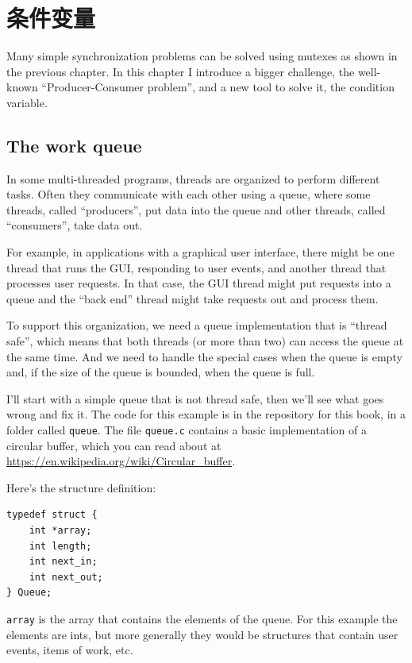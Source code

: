 \documentclass[12pt]{book}
\begin{document}
{\chapter{条件变量}
\label{csem}

Many simple synchronization problems can be solved using mutexes
as shown in the previous chapter.  In this chapter I introduce a
bigger challenge, the well-known ``Producer-Consumer problem'', and
a new tool to solve it, the condition variable.

\section{The work queue}
\label{queue}

In some multi-threaded programs, threads are organized to perform
different tasks.  Often they communicate with each other using a queue,
where some threads, called ``producers'', put data into the queue
and other threads, called ``consumers'', take data out.

For example, in applications with a graphical user interface, there
might be one thread that runs the GUI, responding to user events,
and another thread that processes user requests.  In that case,
the GUI thread might put requests into a queue and the ``back end''
thread might take requests out and process them.

To support this organization, we need a queue implementation that is
``thread safe'', which means that both threads (or more than two) can
access the queue at the same time.  And we need to handle the special
cases when the queue is empty and, if the size of the queue is
bounded, when the queue is full.

I'll start with a simple queue that is not thread safe, then we'll see
what goes wrong and fix it.  The code for this example is in the
repository for this book, in a folder called {\tt queue}.  The file
{\tt queue.c} contains a basic implementation of a circular buffer,
which you can read about at
\url{https://en.wikipedia.org/wiki/Circular_buffer}.

Here's the structure definition:

\begin{verbatim}
typedef struct {
    int *array;
    int length;
    int next_in;
    int next_out;
} Queue;
\end{verbatim}

{\tt array} is the array that contains the elements of the queue.
For this example the elements are ints, but more generally
they would be structures that contain user events, items of work, etc.

}
\end{document}
